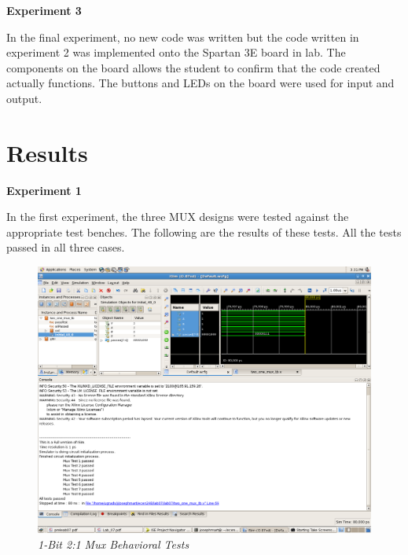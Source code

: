 \documentclass[a4paper,12pt]{article}
\begin{document}
  

  

  

  \hspace{-15pt}\textbf{Experiment 3}

  \vspace{15pt}In the final experiment, no new code was written but the code
  written in experiment 2 was implemented onto the Spartan 3E board in lab.
  The components on the board allows the student to confirm that the code created
  actually functions. The buttons and LEDs on the board were used for input and
  output.

  \section*{Results}

  \textbf{Experiment 1}

  \vspace{15pt}In the first experiment, the three MUX designs were tested against
  the appropriate test benches. The following are the results of these tests.
  All the tests passed in all three cases.

  \begin{figure}[h]
    \begin{center}
      \includegraphics[scale=0.18]{1_1_1.png}
      \caption{\textit{1-Bit 2:1 Mux Behavioral Tests}}
    \end{center}
  \end{figure}
\end{document}
